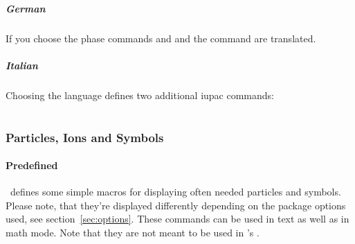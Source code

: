 \documentclass[load-preamble+]{cnltx-doc}
\begin{document}
\subsubsection{German}
If you choose  the phase commands  and 
and the command  are translated.

\subsubsection{Italian}
%
Choosing the language  defines two additional \ac{iupac} commands:
\begin{commands}
   \iupac{\ter}
   \iupac{\sin}
\end{commands}

\part{\chemmacros}\label{part:chemmacros}
\section{Particles, Ions and Symbols}\label{sec:particles}
\subsection{Predefined}

\chemmacros\ defines some simple macros for displaying often needed particles
and symbols.  Please note, that they're displayed differently depending on the
package options used, see section~\ref{sec:options}.  These commands can be
used in text as well as in math mode.  Note that they are not meant to be used
in \chemformula's .
\end{document}

